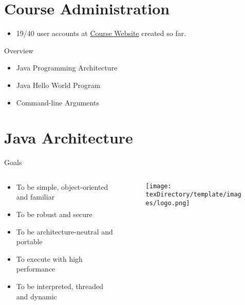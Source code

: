 \documentclass[10pt, compress]{beamer}
\begin{document}
\prepareCover

\section{Course Administration}

\begin{slide}
	\begin{itemize}
		\item[] 19/40 user accounts at \href{http://www.ghorbanzade.com}{Course Website} created so far.
	\end{itemize}
\end{slide}

\begin{slide}
	\begin{block}{Overview}
		\begin{itemize}
			\item[] Java Programming Architecture
			\item[] Java Hello World Program
			\item[] Command-line Arguments
		\end{itemize}
	\end{block}
\end{slide}

\section{Java Architecture}

\begin{slide}
	\begin{block}{Goals}
		\begin{columns}
			\begin{column}{0.7\textwidth}
			\begin{itemize}
				\item[] To be simple, object-oriented and familiar
				\item[] To be robust and secure
				\item[] To be architecture-neutral and portable
				\item[] To execute with high performance
				\item[] To be interpreted, threaded and dynamic
			\end{itemize}
			\end{column}
			\begin{column}{0.3\textwidth}
			\begin{figure}
				\texttt{[image: \\texDirectory/template/images/logo.png]}
			\end{figure}
			\end{column}
		\end{columns}
	\end{block}
\end{slide}
\end{document}
